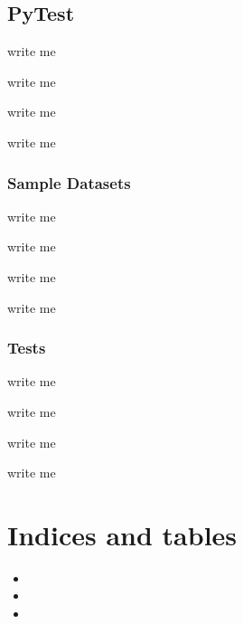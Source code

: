 \documentclass[letterpaper,10pt,english]{sphinxmanual}
\begin{document}
\section{PyTest}
\label{\detokenize{DevTools:pytest}}
\begin{DUlineblock}{0em}
\item[] write me
\item[] write me
\item[] write me
\item[] write me
\end{DUlineblock}


\subsection{Sample Datasets}
\label{\detokenize{DevTools:sample-datasets}}
\begin{DUlineblock}{0em}
\item[] write me
\item[] write me
\item[] write me
\item[] write me
\end{DUlineblock}


\subsection{Tests}
\label{\detokenize{DevTools:tests}}
\begin{DUlineblock}{0em}
\item[] write me
\item[] write me
\item[] write me
\item[] write me
\end{DUlineblock}


\chapter{Indices and tables}
\label{\detokenize{index:indices-and-tables}}\begin{itemize}
\item {} 
\sphinxAtStartPar
{}

\item {} 
\sphinxAtStartPar
{}

\item {} 
\sphinxAtStartPar
{}

\end{itemize}
\end{document}
